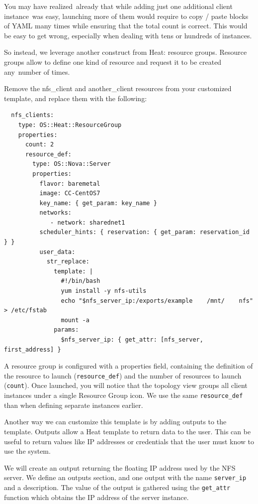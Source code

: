 You may have realized~already that while adding just one additional
client instance~was easy, launching more of them would require to copy /
paste blocks of YAML many times while ensuring that the total count is
correct. This would be easy to get wrong, especially when dealing with
tens or hundreds of instances.

So instead, we leverage another construct from Heat: resource groups.
Resource groups allow to define one kind of resource and request it to
be created any~number of times.

Remove the nfs\_client and another\_client resources from your
customized template, and replace them with the following:

\begin{footnotesize}
\begin{verbatim}
  nfs_clients:
    type: OS::Heat::ResourceGroup
    properties:
      count: 2
      resource_def:
        type: OS::Nova::Server
        properties:
          flavor: baremetal
          image: CC-CentOS7
          key_name: { get_param: key_name }
          networks:
             - network: sharednet1
          scheduler_hints: { reservation: { get_param: reservation_id } }
          user_data:
            str_replace:
              template: |
                #!/bin/bash
                yum install -y nfs-utils
                echo "$nfs_server_ip:/exports/example    /mnt/    nfs" > /etc/fstab
                mount -a
              params:
                $nfs_server_ip: { get_attr: [nfs_server, first_address] }
\end{verbatim}
\end{footnotesize}

A resource group is configured with a properties field, containing the
definition of the resource to launch (\texttt{resource\_def}) and the
number of resources to launch (\texttt{count}). Once launched, you will
notice that the topology view groups all client instances under a single
Resource Group icon. We use the same \texttt{resource\_def} than when
defining separate instances earlier.

Another way we can customize this template is by adding outputs to the
template. Outputs allow a Heat template to return data to the user. This
can be useful to return values like IP addresses or credentials that the
user must know to use the system.

We will create an output returning the floating IP address used by the
NFS server. We define an outputs section, and one output with the name
\texttt{server\_ip} and a description. The value of the output is
gathered using the \texttt{get\_attr} function which obtains the IP
address of the server instance.

